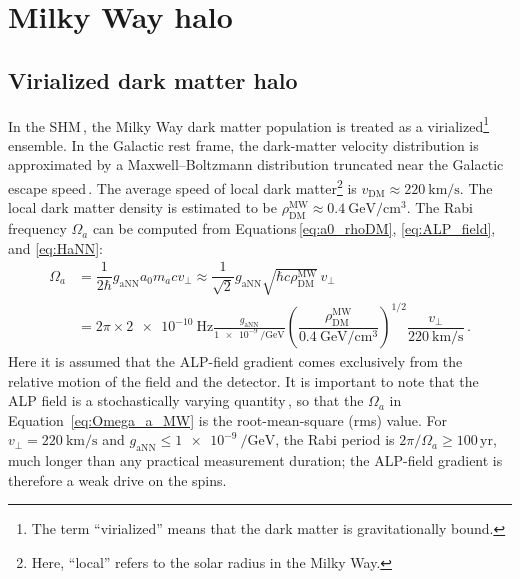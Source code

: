 \section{Milky Way halo}\label{sec:theory:MWALP}

\subsection{Virialized dark matter halo}

In the SHM\,\cite{Evans2019_SHMRefined}, the Milky Way dark matter population is treated as a virialized\footnote{The term ``virialized'' means that the dark matter is gravitationally bound. } ensemble.
In the Galactic rest frame, the dark-matter velocity distribution is approximated by a Maxwell--Boltzmann distribution truncated near the Galactic escape speed\,\cite{Evans2019_SHMRefined}.
The average speed of local dark matter\footnote{Here, ``local'' refers to the solar radius in the Milky Way.} is $v_\mathrm{DM} \approx \SI{220}{\km\per\s}$.
The local dark matter density is estimated to be $\rho_\mathrm{DM}^\mathrm{MW}\approx\SI{0.4}{\giga\electronvolt\per\centi\meter\cubed}$.
The Rabi frequency $\Omega_a$ can be computed from Equations\,\eqref{eq:a0_rhoDM}, \eqref{eq:ALP_field}, and \eqref{eq:HaNN}:
\begin{align}
    \Omega_a
    & = \dfrac{1}{2\hbar} g_{\mathrm{aNN}} a_0 m_a c v_{\bot}
    \approx \dfrac{1}{\sqrt{2}} g_{\mathrm{aNN}} \sqrt{\hbar c \rho_\mathrm{DM}^\mathrm{MW}}\,v_{\bot}\\
    & = 2 \pi \times \SI{2e-10}{\Hz} \frac{g_{\mathrm{aNN}}}{\SI{1e-9}{\per\GeV}} \left(\dfrac{\rho_\mathrm{DM}^\mathrm{MW}}{\SI{0.4}{\giga\electronvolt\per\centi\meter\cubed}}\right)^{1/2}\dfrac{v_{\bot}}{\SI{220}{\km\per\s}}
    \,.
    \label{eq:Omega_a_MW}
\end{align}
Here it is assumed that the ALP-field gradient comes exclusively from the relative motion of the field and the detector.
It is important to note that the ALP field is a stochastically varying quantity\,\cite{Centers2021Stochastic}, so that the $\Omega_a$ in Equation~\eqref{eq:Omega_a_MW} is the root-mean-square (rms) value.
For $v_{\bot} = \SI{220}{\km\per\second}$ and $g_{\mathrm{aNN}}\leq \SI{1e-9}{\per\GeV}$, the Rabi period is $2\pi/\Omega_a \geq 100\,\mathrm{yr}$, much longer than any practical measurement duration; the ALP-field gradient is therefore a weak drive on the spins.

